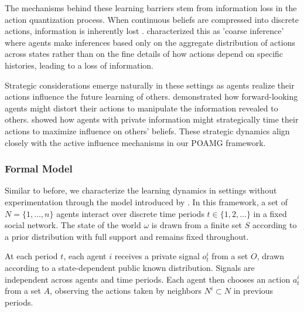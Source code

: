 \documentclass[a4paper,12pt]{report}
\begin{document}
The mechanisms behind these learning barriers stem from information loss in the action quantization process. When continuous beliefs are compressed into discrete actions, information is inherently lost \citep{smith2000pathological}. \citet{guarino2013social} characterized this as 'coarse inference' where agents make inferences based only on the aggregate distribution of actions across states rather than on the fine details of how actions depend on specific histories, leading to a loss of information.

Strategic considerations emerge naturally in these settings as agents realize their actions influence the future learning of others. \citet{bhattacharya2013strategic} demonstrated how forward-looking agents might distort their actions to manipulate the information revealed to others. \citet{ARIELI2019185} showed how agents with private information might strategically time their actions to maximize influence on others' beliefs. These strategic dynamics align closely with the active influence mechanisms in our POAMG framework.

\subsubsection{Formal Model}
Similar to before, we characterize the learning dynamics in settings without experimentation through the model introduced by \citet{brandl2024}. In this framework, a set of $N= \{1, \ldots, n\}$ agents interact over discrete time periods $t \in \{1, 2, \ldots\}$ in a fixed social network. The state of the world $\omega$ is drawn from a finite set $S$ according to a prior distribution with full support and remains fixed throughout.

At each period $t$, each agent $i$ receives a private signal $o^i_t$ from a set $O$, drawn according to a state-dependent public known distribution. Signals are independent across agents and time periods. Each agent then chooses an action $a^i_t$ from a set $A$, observing the actions taken by neighbors $N^i \subset N$ in previous periods.
\end{document}
